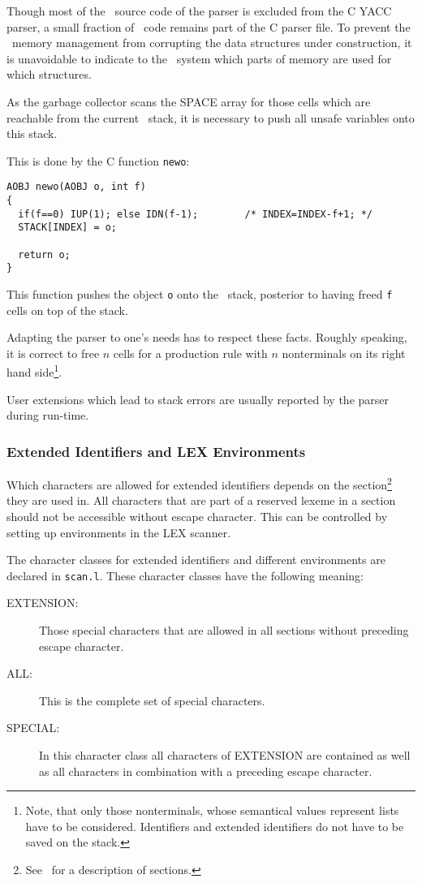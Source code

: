 Though most of the \ALDES\ source code of the parser is excluded
from the C YACC parser, a small fraction of \ALDES\ code remains part
of the C parser file. To prevent the \ALDES\ memory management from
corrupting the data structures under construction, it is
unavoidable to indicate to the  \ALDES\ system which parts of memory are
used for which structures.

As the garbage collector scans the SPACE array for those cells
which are reachable from the current \ALDES\ stack, it is necessary to
push all unsafe variables onto this stack.

This is done by the C function {\tt newo}:
\begin{verbatim}
AOBJ newo(AOBJ o, int f)
{
  if(f==0) IUP(1); else IDN(f-1);        /* INDEX=INDEX-f+1; */
  STACK[INDEX] = o;

  return o;
}
\end{verbatim}
This function pushes the object {\tt o} onto the \ALDES\ stack, posterior to
having freed {\tt f} cells on top of the stack.

Adapting the parser to one's needs has to respect these facts.
Roughly speaking, it is correct to free $n$ cells for a production
rule with $n$ nonterminals on its right hand side\footnote{Note, that
only those nonterminals, whose semantical values represent lists
have to be considered. Identifiers and extended identifiers
do not have to be saved on the stack.}.

User extensions which lead to stack errors are usually reported by
the parser during run-time.

\subsubsection{Extended Identifiers and LEX Environments}
\label{environments}

Which characters are allowed for extended identifiers depends
on the section\footnote{See \NPUG\ for a description of sections.}
they are used in.
All characters that are part of a reserved lexeme in a section should
not be accessible without escape character. This can be controlled
by setting up environments in the LEX scanner.

The character classes for extended identifiers and different environments
are declared in {\tt scan.l}. These character classes have the following
meaning:
\begin{description}
\item[EXTENSION:] Those special characters that are allowed in all sections
 without preceding escape character.
\item[ALL:] This is the complete set of special characters.
\item[SPECIAL:] In this character class all characters of EXTENSION are
 contained as well as all characters in combination with a preceding
 escape character.
\end{description}


